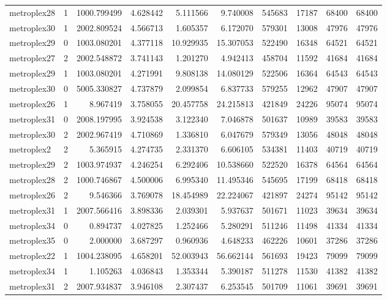 \begin{longtable}{|l|r|r|r|r|r|r|r|r|r|}
metroplex28 & 1 & 1000.799499 & 4.628442 & 5.111566 & 9.740008 & 545683 & 17187 & 68400 & 68400 \\
metroplex30 & 1 & 2002.809524 & 4.566713 & 1.605357 & 6.172070 & 579301 & 13008 & 47976 & 47976 \\
metroplex29 & 0 & 1003.080201 & 4.377118 & 10.929935 & 15.307053 & 522490 & 16348 & 64521 & 64521 \\
metroplex27 & 2 & 2002.548872 & 3.741143 & 1.201270 & 4.942413 & 458704 & 11592 & 41684 & 41684 \\
metroplex29 & 1 & 1003.080201 & 4.271991 & 9.808138 & 14.080129 & 522506 & 16364 & 64543 & 64543 \\
metroplex30 & 0 & 5005.330827 & 4.737879 & 2.099854 & 6.837733 & 579255 & 12962 & 47907 & 47907 \\
metroplex26 & 1 & 8.967419 & 3.758055 & 20.457758 & 24.215813 & 421849 & 24226 & 95074 & 95074 \\
metroplex31 & 0 & 2008.197995 & 3.924538 & 3.122340 & 7.046878 & 501637 & 10989 & 39583 & 39583 \\
metroplex30 & 2 & 2002.967419 & 4.710869 & 1.336810 & 6.047679 & 579349 & 13056 & 48048 & 48048 \\
metroplex2 & 2 & 5.365915 & 4.274735 & 2.331370 & 6.606105 & 534381 & 11403 & 40719 & 40719 \\
metroplex29 & 2 & 1003.974937 & 4.246254 & 6.292406 & 10.538660 & 522520 & 16378 & 64564 & 64564 \\
metroplex28 & 2 & 1000.746867 & 4.500006 & 6.995340 & 11.495346 & 545695 & 17199 & 68418 & 68418 \\
metroplex26 & 2 & 9.546366 & 3.769078 & 18.454989 & 22.224067 & 421897 & 24274 & 95142 & 95142 \\
metroplex31 & 1 & 2007.566416 & 3.898336 & 2.039301 & 5.937637 & 501671 & 11023 & 39634 & 39634 \\
metroplex34 & 0 & 0.894737 & 4.027825 & 1.252466 & 5.280291 & 511246 & 11498 & 41334 & 41334 \\
metroplex35 & 0 & 2.000000 & 3.687297 & 0.960936 & 4.648233 & 462226 & 10601 & 37286 & 37286 \\
metroplex22 & 1 & 1004.238095 & 4.658201 & 52.003943 & 56.662144 & 561693 & 19423 & 79099 & 79099 \\
metroplex34 & 1 & 1.105263 & 4.036843 & 1.353344 & 5.390187 & 511278 & 11530 & 41382 & 41382 \\
metroplex31 & 2 & 2007.934837 & 3.946108 & 2.307437 & 6.253545 & 501709 & 11061 & 39691 & 39691 \\

\end{longtable}
